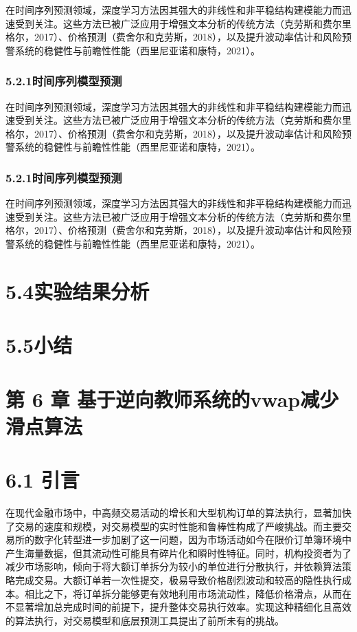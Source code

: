 在时间序列预测领域，深度学习方法因其强大的非线性和非平稳结构建模能力而迅速受到关注。这些方法已被广泛应用于增强文本分析的传统方法（克劳斯和费尔里格尔，2017）、价格预测（费舍尔和克劳斯，2018），以及提升波动率估计和风险预警系统的稳健性与前瞻性性能（西里尼亚诺和康特，2021）。

\subsubsection{5.2.1时间序列模型预测}
在时间序列预测领域，深度学习方法因其强大的非线性和非平稳结构建模能力而迅速受到关注。这些方法已被广泛应用于增强文本分析的传统方法（克劳斯和费尔里格尔，2017）、价格预测（费舍尔和克劳斯，2018），以及提升波动率估计和风险预警系统的稳健性与前瞻性性能（西里尼亚诺和康特，2021）。

\subsubsection{5.2.1时间序列模型预测}

在时间序列预测领域，深度学习方法因其强大的非线性和非平稳结构建模能力而迅速受到关注。这些方法已被广泛应用于增强文本分析的传统方法（克劳斯和费尔里格尔，2017）、价格预测（费舍尔和克劳斯，2018），以及提升波动率估计和风险预警系统的稳健性与前瞻性性能（西里尼亚诺和康特，2021）。

\section{5.4实验结果分析}

\section{5.5小结}

\section{第 6 章
基于逆向教师系统的vwap减少滑点算法}

\section{6.1 引言}

在现代金融市场中，中高频交易活动的增长和大型机构订单的算法执行，显著加快了交易的速度和规模，对交易模型的实时性能和鲁棒性构成了严峻挑战。而主要交易所的数字化转型进一步加剧了这一问题，因为市场活动如今在限价订单簿环境中产生海量数据，但其流动性可能具有碎片化和瞬时性特征。同时，机构投资者为了减少市场影响，倾向于将大额订单拆分为较小的单位进行分散执行，并依赖算法策略完成交易。大额订单若一次性提交，极易导致价格剧烈波动和较高的隐性执行成本。相比之下，将订单拆分能够更有效地利用市场流动性，降低价格滑点，从而在不显著增加总完成时间的前提下，提升整体交易执行效率。实现这种精细化且高效的算法执行，对交易模型和底层预测工具提出了前所未有的挑战。

